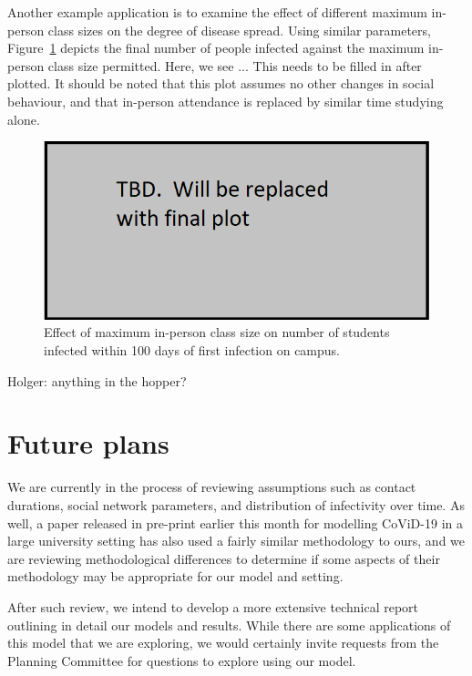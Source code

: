 \documentclass[fleqn,10pt]{SelfArx} %
\newcommand{\ed}[1]{{\color{blue} #1}}
\begin{document}
Another example application is to examine the effect of different maximum in-person class sizes on the degree of disease spread.  Using similar parameters, Figure~\ref{fig:classsize} depicts the final number of people infected against the maximum in-person class size permitted.  Here, we see ...\ed{This needs to be filled in after plotted}.  It should be noted that this plot assumes no other changes in social behaviour, and that in-person attendance is replaced by similar time studying alone.    

\begin{figure}[ht]\centering %
	\includegraphics[width=\linewidth]{classsize}
	\caption{Effect of maximum in-person class size on number of students infected within 100 days of first infection on campus.}
	\label{fig:classsize}
\end{figure}

\ed{Holger:  anything in the hopper?}

\section{Future plans}

We are currently in the process of reviewing assumptions such as contact durations, social network parameters, and distribution of infectivity over time.  As well, a paper released in pre-print earlier this month for modelling CoViD-19 in a large university setting has also used a fairly similar methodology to ours, and we are reviewing methodological differences to determine if some aspects of their methodology may be appropriate for our model and setting.

After such review, we intend to develop a more extensive technical report outlining in detail our models and results.  While there are some applications of this model that we are exploring, we would certainly invite requests from the Planning Committee for questions to explore using our model. 
\end{document}
